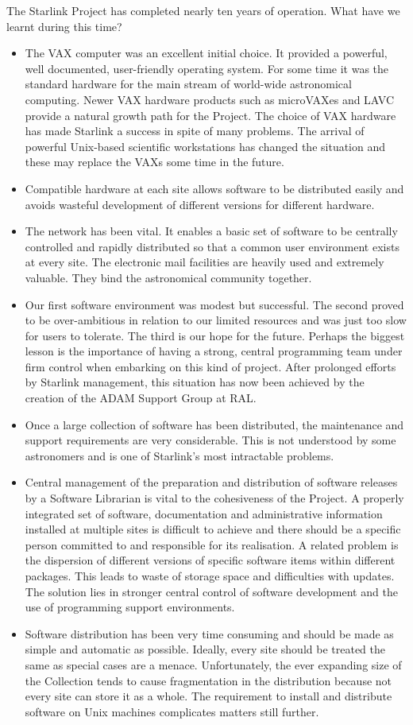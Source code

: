 The Starlink Project has completed nearly ten years of operation.
What have we learnt during this time?
\begin{itemize}
\item The VAX computer was an excellent initial choice.
It provided a powerful, well documented, user-friendly operating system.
For some time it was the standard hardware for the main stream of world-wide
astronomical computing.
Newer VAX hardware products such as microVAXes and LAVC provide a natural
growth path for the Project.
The choice of VAX hardware has made Starlink a success in spite of many
problems.
The arrival of powerful Unix-based scientific workstations has changed the
situation and these may replace the VAXs some time in the future.
\item Compatible hardware at each site allows software to be distributed easily
and avoids wasteful development of different versions for different hardware.
\item The network has been vital.
It enables a basic set of software to be centrally controlled and rapidly
distributed so that a common user environment exists at every site.
The electronic mail facilities are heavily used and extremely valuable.
They bind the astronomical community together.
\item Our first software environment was modest but successful.
The second proved to be over-ambitious in relation to our limited
resources and was just too slow for users to tolerate.
The third is our hope for the future.
Perhaps the biggest lesson is the importance of having a strong, central
programming team under firm control when embarking on this kind of project.
After prolonged efforts by Starlink management, this situation has now been
achieved by the creation of the ADAM Support Group at RAL.
\item Once a large collection of software has been distributed, the maintenance
and support requirements are very considerable.
This is not understood by some astronomers and is one of Starlink's most
intractable problems.
\item Central management of the preparation and distribution of software releases
by a Software Librarian is vital to the cohesiveness of the Project.
A properly integrated set of software, documentation and administrative
information installed at multiple sites is difficult to achieve and there
should be a specific person committed to and responsible for its realisation.
A related problem is the dispersion of different versions of specific software
items within different packages.
This leads to waste of storage space and difficulties with updates.
The solution lies in stronger central control of software development and the
use of programming support environments.
\item Software distribution has been very time consuming and should be made
as simple and automatic as possible.
Ideally, every site should be treated the same as special cases are a menace.
Unfortunately, the ever expanding size of the Collection tends to cause
fragmentation in the distribution because not every site can store it as a
whole.
The requirement to install and distribute software on Unix machines complicates
matters still further.


\end{itemize}
